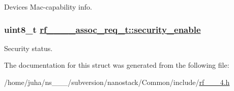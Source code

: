 Devices Mac-capability info. \hypertarget{structrf__802__15__4__assoc__req__t_271943aeb65f1e9b6f872e209c631416}{
\subsubsection[security\_\-enable]{\setlength{\rightskip}{0pt plus 5cm}uint8\_\-t \hyperlink{structrf__802__15__4__assoc__req__t_271943aeb65f1e9b6f872e209c631416}{rf\_\_\_\_\-assoc\_\-req\_\-t::security\_\-enable}}}
\label{structrf__802__15__4__assoc__req__t_271943aeb65f1e9b6f872e209c631416}


Security status. 

The documentation for this struct was generated from the following file:\begin{CompactItemize}
\item 
/home/juha/ns\_\_\_/subversion/nanostack/Common/include/\hyperlink{rf__802__15__4_8h}{rf\_\_\_\-4.h}\end{CompactItemize}
